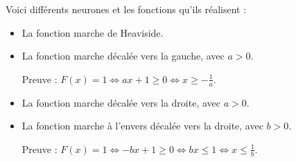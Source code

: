 Voici différents neurones et les fonctions qu'ils réalisent :
\begin{itemize}
	\item La fonction marche de Heaviside.
	
	\begin{center}
		\begin{minipage}{0.35\textwidth}
		\end{minipage}
		\begin{minipage}{0.59\textwidth}
		\end{minipage}
	\end{center}  
	
	
	\item La fonction marche décalée vers la gauche, avec $a>0$.
	
	Preuve : $F(x) = 1 \iff ax+1\ge0 \iff x \ge -\frac1a$.
	
	\begin{center}
		\begin{minipage}{0.35\textwidth}
		\end{minipage}
		\begin{minipage}{0.59\textwidth}
		\end{minipage}
	\end{center}    
	
	\item La fonction marche décalée vers la droite, avec $a>0$.  
	
	\begin{center}
		\begin{minipage}{0.35\textwidth}
		\end{minipage}
		\begin{minipage}{0.59\textwidth}
		\end{minipage}
	\end{center}    
	
	
	\item La fonction marche à l'envers décalée vers la droite, avec $b>0$.
	
	Preuve : $F(x) = 1 \iff -bx+1\ge0 \iff bx \le 1 \iff x \le \frac1b$.
	
	\begin{center}
		\begin{minipage}{0.35\textwidth}
		\end{minipage}
		\begin{minipage}{0.59\textwidth}
		\end{minipage}
	\end{center}  
	

\end{itemize}
